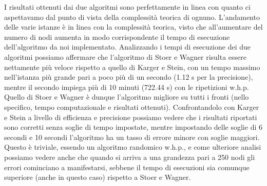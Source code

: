 I risultati ottenuti dai due algoritmi sono perfettamente in linea con quanto ci aspettavamo dal punto di vista della complessità teorica di ognuno. L'andamento delle varie istanze è in linea con la complessità teorica, visto che all'aumentare del numero di nodi aumenta in modo corrispondente il tempo di esecuzione dell'algoritmo da noi implementato. 
Analizzando i tempi di esecuzione dei due algoritmi possiamo affermare che l'algoritmo di Stoer e Wagner risulta essere nettamente più veloce rispetto a quello di Karger e Stein, con un tempo massimo nell'istanza più grande pari a poco più di un secondo (1.12 s per la precisione), mentre il secondo impiega più di 10 minuti (722.44 s) con le ripetizioni w.h.p. Quello di Stoer e Wagner è dunque l'algoritmo migliore su tutti i fronti (nello specifico, tempo computazionale e risultati ottenuti). Confrontandolo con Karger e Stein a livello di efficienza e precisione possiamo vedere che i risultati riportati sono corretti senza soglie di tempo impostate, mentre impostando delle soglie di 6 secondi e 10 secondi l'algoritmo ha un tasso di errore minore con soglie maggiori. Questo è triviale, essendo un algoritmo randomico w.h.p., e come ulteriore analisi possiamo vedere anche che quando si arriva a una grandezza pari a 250 nodi gli errori cominciano a manifestarsi, sebbene il tempo di esecuzioni sia comunque superiore (anche in questo caso) rispetto a Stoer e Wagner. 
